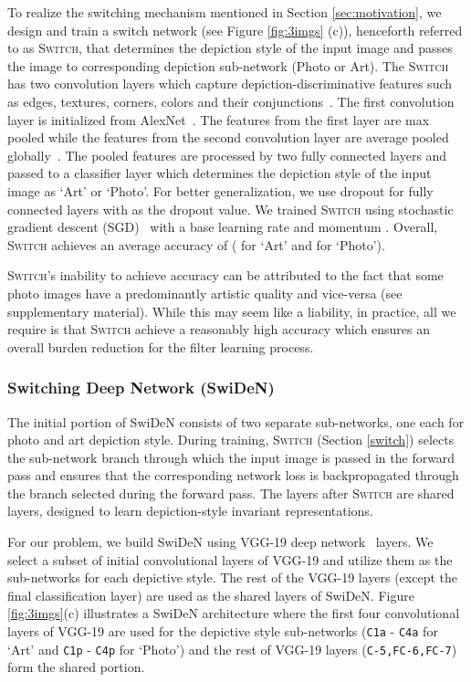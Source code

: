 \documentclass[preprint]{sig-alternate-05-2015}
\begin{document}
To realize the switching mechanism mentioned in Section \ref{sec:motivation}, we design and train a switch network (see Figure \ref{fig:3imgs} (c)), henceforth referred to as \textsc{Switch}, that determines the depiction style of the input image and passes the image to corresponding depiction sub-network (Photo or Art). The \textsc{Switch} has two convolution layers which capture depiction-discriminative features such as edges, textures, corners, colors and their  conjunctions~\cite{zeiler2014visualizing}.  The first convolution layer is initialized from AlexNet~\cite{krizhevsky2012imagenet}. The features from the first layer are max pooled while the features from the second convolution layer are average pooled globally~\cite{lin2013network}. The pooled features are processed by two fully connected layers and passed to a classifier layer which determines the depiction style of the input image as `Art' or `Photo'. For better generalization, we use dropout for fully connected layers with  as the dropout value. We trained \textsc{Switch} using stochastic gradient descent (SGD)~\cite{krizhevsky2012imagenet} with a base learning rate  and momentum . Overall, \textsc{Switch} achieves an average accuracy of  ( for `Art' and  for `Photo'). 

\textsc{Switch}'s inability to achieve  accuracy can be attributed to the fact that some photo images have a predominantly artistic quality and vice-versa (see supplementary material). While this may seem like a liability, in practice, all we require is that \textsc{Switch} achieve a reasonably high accuracy which ensures an overall burden reduction for the filter learning process.

\subsubsection{\textbf{Switching Deep Network (SwiDeN)}}
\label{swiden}

The initial portion of SwiDeN consists of two separate sub-networks, one each for photo and art depiction style. During training, \textsc{Switch} (Section \ref{switch}) selects the sub-network branch through which the input image is passed in the forward pass and ensures that the corresponding network loss is backpropagated through the branch selected during the forward pass. The layers after \textsc{Switch} are shared layers, designed to learn   depiction-style invariant representations. 

For our problem, we build SwiDeN using VGG-19 deep network~\cite{Simonyan14c} layers. We select a subset of initial convolutional layers of VGG-19 and utilize them as the sub-networks for each depictive style. The rest of the VGG-19 layers (except the final classification layer) are used as the shared layers of SwiDeN. Figure \ref{fig:3imgs}(c) illustrates a SwiDeN architecture where the first four convolutional layers of VGG-19 are used for the depictive style sub-networks (\texttt{C1a} - \texttt{C4a} for `Art' and \texttt{C1p} - \texttt{C4p} for `Photo') and the rest of VGG-19 layers  (\texttt{C-5,FC-6,FC-7}) form the shared portion. 
\end{document}
